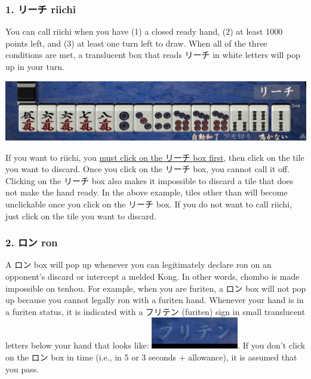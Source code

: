 \subsubsection{1. リーチ {\jap riichi} } 
You can call {\jap riichi} when you have (1) a closed ready hand, (2) at least 1000 points left, and (3) at least one turn left to draw. When all of the three conditions are met, a translucent box that reads リーチ in white letters will pop up in your turn. 
\begin{center}
\includegraphics[width=.7\textwidth,clip]{figs/riichi.jpg}
\end{center}
If you want to {\jap riichi}, you \underline{must click on the リーチ box first}, then click on the tile you want to discard. Once you click on the リーチ box, you cannot call it off. Clicking on the リーチ box also makes it impossible to discard a tile that does not make the hand ready. In the above example, tiles other than {\large {}} will become unclickable once you click on the リーチ box. If you do not want to call {\jap riichi}, just click on the tile you want to discard. 

\subsubsection{2. ロン {\jap ron} \textipa{[r\'\textopeno\ng]}}
A ロン box will pop up whenever you can legitimately declare {\jap ron} on an opponent's discard or intercept a melded Kong. In other words, {\jap chombo} is made impossible on {\jap tenhou}. For example, when you are {\jap furiten}, a ロン box will not pop up because you cannot legally {\jap ron} with a {\jap furiten} hand. Whenever your hand is in a {\jap furiten} status, it is indicated with a フリテン ({\jap furiten}) sign in small translucent letters below your hand that looks like: \includegraphics[width=.12\textwidth,clip]{figs/furiten.jpg}.
If you don't click on the ロン box in time (i.e., in 5 or 3 seconds + allowance), it is assumed that you pass. 

